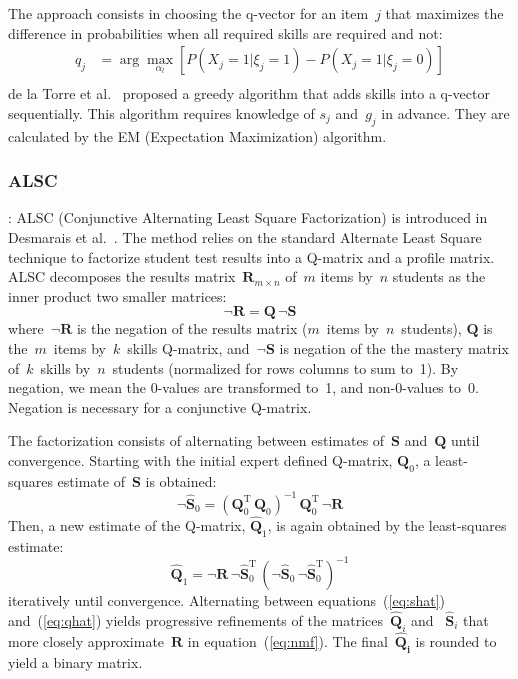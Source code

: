 \documentclass[runningheads,a4paper]{llncs}
\begin{document}
The approach consists in choosing the q-vector for an item~$j$ that maximizes the difference in probabilities when all required skills are required and not:
\begin{equation} 
\begin{split}
q_j & =\arg\max_{\alpha _l}[P(X_j=1|\xi_{j}=1)-P(X_j=1|\xi_{j}=0)]\\
\end{split}
\end{equation}
de la Torre et al.~\cite{de2008empirically} proposed a greedy algorithm that adds skills into a q-vector sequentially. This algorithm requires knowledge of  $s_j$ and~$g_j$ in advance. They are calculated by the EM (Expectation Maximization) algorithm.
\subsubsection{ALSC} :
ALSC (Conjunctive Alternating Least Square Factorization) is introduced in Desmarais et al.~\cite{desmarais2013matrix,desmarais2015combining}.  The method relies on the standard Alternate Least Square technique to factorize student test results into a Q-matrix and a profile matrix.  
ALSC decomposes the results matrix~$\mathbf{R}_{m \times n}$ of~$m$ items by~$n$ students as the inner product two smaller matrices:
\begin{equation}
  \mathbf{\neg {R}} = \mathbf{Q} \, \neg \mathbf{S} \label{eq:nmf}
\end{equation}
where~$\neg \mathbf{R}$ is the negation of the results matrix ($m$~items by~$n$~students),  $\mathbf{Q}$ is the~$m$~items by~$k$~skills Q-matrix, and~$\neg \mathbf{S}$ is negation of the the mastery matrix of~$k$~skills by~$n$~students (normalized for rows columns to sum to~1).  By negation, we mean the 0-values are transformed to~1, and non-0-values to~0.  Negation is necessary for a conjunctive Q-matrix.

  The factorization consists of alternating between estimates of~$\mathbf{S}$ and~$\mathbf{Q}$ until convergence.  Starting with the initial expert defined Q-matrix, $\mathbf{{Q}}_0$, a least-squares estimate of~$\mathbf{S}$ is obtained:
\begin{equation}
  \neg \mathbf{\hat{S}}_0 = (\mathbf{Q}_0^{\mathrm{T}}  \, \mathbf{Q}_0)^{-1} \, \mathbf{Q}_0^{\mathrm{T}} \, \neg \mathbf{R} \label{eq:shat}
\end{equation}
Then, a new estimate of the Q-matrix, $\mathbf{\hat{Q}}_1$, is again obtained by the least-squares estimate:
\begin{equation}
  \mathbf{\hat{Q}}_1 = \neg \mathbf{R} \, \neg \mathbf{\hat{S}}_0^{\mathrm{T}} \, (\neg \mathbf{\hat{S}}_0 \, \neg \mathbf{\hat{S}}_0^{\mathrm{T}})^{-1} \label{eq:qhat}
\end{equation}
iteratively until convergence.  Alternating between equations~(\ref{eq:shat}) and~(\ref{eq:qhat}) yields progressive refinements of the matrices~$\mathbf{\hat{Q}}_i$ and ~$\mathbf{\hat{S}}_i$ that more closely approximate~$\mathbf{R}$ in equation~(\ref{eq:nmf}).  The final~$\mathbf{\hat{Q}_i}$ is rounded to yield a binary matrix.
\end{document}
